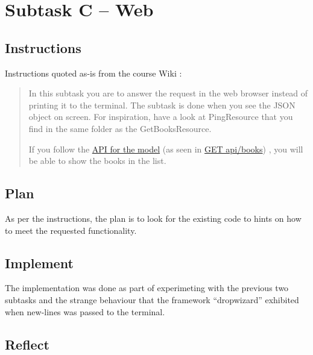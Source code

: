 \section{Subtask C -- Web}\label{subtask-c-web}
\subsection{Instructions}\label{task-1-instructions}
Instructions quoted as-is from the course Wiki \cite{1dv600:lab1:instructions}:

\begin{quote}
  In this subtask you are to answer the request in the web browser instead of
  printing it to the terminal. The subtask is done when you see the JSON object
  on screen. For inspiration, have a look at PingResource that you find in the
  same folder as the GetBooksResource. 

  If you follow the 
  \href{https://htmlpreview.github.io/?https://github.com/tobias-dv-lnu/1dv600-lab/blob/master/api-specification/api-specification.html}{API for the model}
  (as seen in 
  \href{https://htmlpreview.github.io/?https://github.com/tobias-dv-lnu/1dv600-lab/blob/master/api-specification/api-specification.html\#books-get}{GET api/books})
  , you will be able to show the books in the list.
\end{quote}


\subsection{Plan}\label{task-1c-plan}
As per the instructions, the plan is to look for the existing code to hints
on how to meet the requested functionality.

\subsection{Implement}\label{task-1c-implement}
The implementation was done as part of experimeting with the previous two
subtasks and the strange behaviour that the framework ``dropwizard'' exhibited
when new-lines was passed to the terminal.

\subsection{Reflect}\label{task-1c-reflect}
